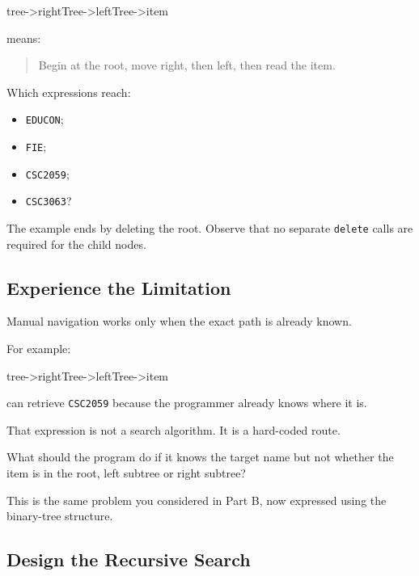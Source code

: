 \documentclass{csc2059practical}
\begin{document}
\begin{cppcode}
tree->rightTree->leftTree->item
\end{cppcode}

means:

\begin{quote}
Begin at the root, move right, then left, then read the item.
\end{quote}

\begin{engineeringquestion}
Which expressions reach:

\begin{itemize}
    \item \texttt{EDUCON};
    \item \texttt{FIE};
    \item \texttt{CSC2059};
    \item \texttt{CSC3063}?
\end{itemize}
\end{engineeringquestion}

The example ends by deleting the root. Observe that no separate
\texttt{delete} calls are required for the child nodes.

\subsection{Experience the Limitation}

Manual navigation works only when the exact path is already known.

For example:

\begin{cppcode}
tree->rightTree->leftTree->item
\end{cppcode}

can retrieve \texttt{CSC2059} because the programmer already knows where it is.

That expression is not a search algorithm. It is a hard-coded route.

\begin{engineeringquestion}
What should the program do if it knows the target name but not whether the item
is in the root, left subtree or right subtree?
\end{engineeringquestion}

This is the same problem you considered in Part B, now expressed using the
binary-tree structure.

\subsection{Design the Recursive Search}
\end{document}

